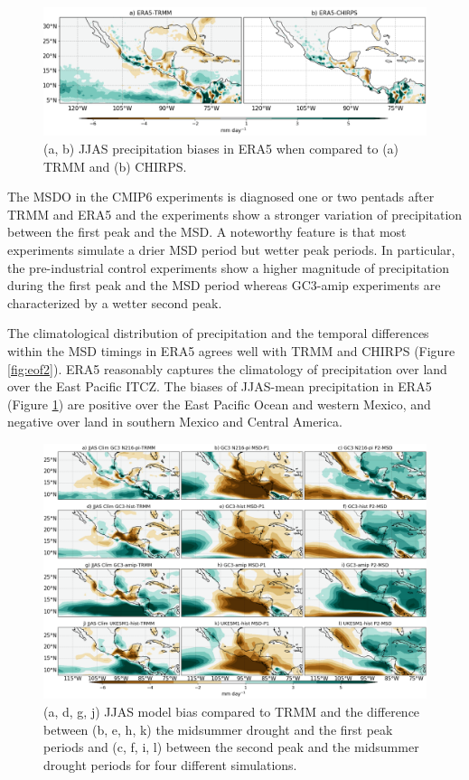 \begin{figure}[b!]
\includegraphics[width=\linewidth]{figures/fig_Era5}
\caption[ERA5 precipitation biases]{ (a, b) JJAS precipitation biases in ERA5 when compared to (a) TRMM and (b) CHIRPS. }
\label{fig:era5_bias_pr}
\end{figure}
 

The MSDO in the CMIP6 experiments is diagnosed one or two pentads after TRMM and ERA5 and the experiments show a stronger variation of precipitation between the first peak and the MSD. A noteworthy feature is that most experiments simulate a drier MSD period but wetter peak periods.
In particular, the pre-industrial control experiments show a higher magnitude of precipitation during the first peak and the MSD period whereas GC3-amip experiments are characterized by a wetter second peak. 


 The climatological distribution of precipitation and the temporal differences within the MSD timings in ERA5 agrees well with TRMM and CHIRPS (Figure \ref{fig:eof2}). ERA5 reasonably captures the climatology of precipitation over land over the East Pacific ITCZ. The biases of JJAS-mean precipitation in ERA5  (Figure \ref{fig:era5_bias_pr}) are positive over the East Pacific Ocean and western Mexico, and negative over land in southern Mexico and Central America.
 
  \begin{figure}[b!]
\includegraphics[width=\linewidth]{figures/fig2obs_prmodels3.png}
\caption[Composite mean precipitation biases and seasonal variations]{ (a, d, g, j) JJAS model bias compared to TRMM and the difference between  (b, e, h, k)  the midsummer drought and the first peak periods and (c, f, i, l)  between the second peak and the midsummer drought periods for four different simulations.}
\label{fig:model_pr}
\end{figure} 
  
